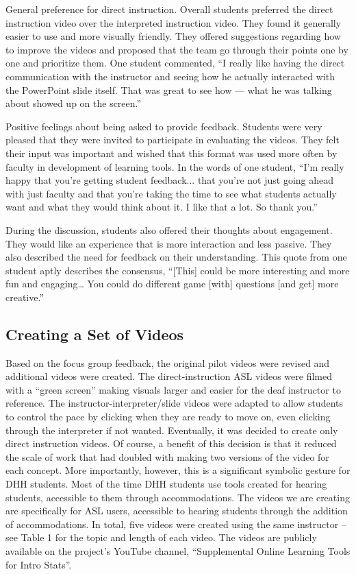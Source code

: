 \documentclass[11.5pt]{sig-alternate} %
\begin{document}
\begin{large}
General preference for direct instruction. Overall students preferred the direct instruction video over the interpreted instruction video. They found it generally easier to use and more visually friendly. They offered suggestions regarding how to improve the videos and proposed that the team go through their points one by one and prioritize them. One student commented, “I really like having the direct communication with the instructor and seeing how he actually interacted with the PowerPoint slide itself. That was great to see how — what he was talking about showed up on the screen.”

Positive feelings about being asked to provide feedback. Students were very pleased that they were invited to participate in evaluating the videos. They felt their input was important and wished that this format was used more often by faculty in development of learning tools. In the words of one student, “I'm really happy that you’re getting student feedback... that you're not just going ahead with just faculty and that you're taking the time to see what students actually want and what they would think about it. I like that a lot. So thank you.”

During the discussion, students also offered their thoughts about engagement. They would like an experience that is more interaction and less passive. They also described the need for feedback on their understanding. This quote from one student aptly describes the consensus, “[This] could be more interesting and more fun and engaging… You could do different game [with] questions [and get] more creative.” 

\subsection*{Creating a Set of Videos}

Based on the focus group feedback, the original pilot videos were revised and additional videos were created. The direct-instruction ASL videos were filmed with a “green screen” making visuals larger and easier for the deaf instructor to reference. The instructor-interpreter/slide videos were adapted to allow students to control the pace by clicking when they are ready to move on, even clicking through the interpreter if not wanted. Eventually, it was decided to create only direct instruction videos. Of course, a benefit of this decision is that it reduced the scale of work that had doubled with making two versions of the video for each concept. More importantly, however, this is a significant symbolic gesture for DHH students. Most of the time DHH students use tools created for hearing students, accessible to them through accommodations. The videos we are creating are specifically for ASL users, accessible to hearing students through the addition of accommodations. In total, five videos were created using the same instructor – see Table 1 for the topic and length of each video. The videos are publicly available on the project’s YouTube channel, “Supplemental Online Learning Tools for Intro Stats”.


\end{large}
\end{document}
